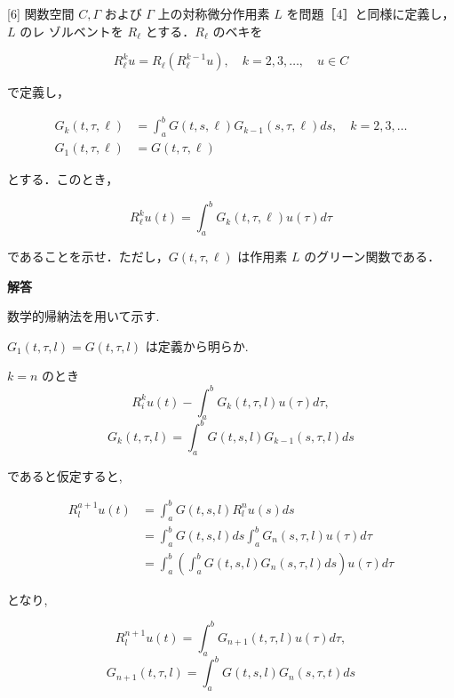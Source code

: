\documentclass{jsarticle}
\begin{document}
\begin{itembox}[l]{[6]}
関数空間 $C, \Gamma$ および $\Gamma$ 上の対称微分作用素 $L$ を問題［4］と同様に定義し，$L$ のレ ゾルベントを $R_{\ell}$ とする．$R_{\ell}$ のベキを


\begin{equation*}
R_{\ell}^{k} u=R_{\ell}\left(R_{\ell}^{k-1} u\right), \quad k=2,3, \ldots, \quad u \in C \tag{12}
\end{equation*}


で定義し，


\begin{align*}
G_{k}(t, \tau, \ell) & =\int_{a}^{b} G(t, s, \ell) G_{k-1}(s, \tau, \ell) d s, \quad k=2,3, \ldots  \tag{13}\\
G_{1}(t, \tau, \ell) & =G(t, \tau, \ell) \tag{14}
\end{align*}


とする．このとき，


\begin{equation*}
R_{\ell}^{k} u(t)=\int_{a}^{b} G_{k}(t, \tau, \ell) u(\tau) d \tau \tag{15}
\end{equation*}


であることを示せ．ただし，$G(t, \tau, \ell)$ は作用素 $L$ のグリーン関数である．  
\end{itembox}

\textbf{解答}

数学的帰納法を用いて示す.

$G_{1}(t, \tau, l) = G(t, \tau, l)$ は定義から明らか.

$k = n$ のとき
$$
R_{i}^{k} u(t)-\int_{a}^{b} G_{k}(t, \tau, l) u(\tau) d \tau,
$$
$$
G_k(t, \tau, l) = \int_a^b G(t,s,l)G_{k-1}(s,\tau,l) ds
$$

であると仮定すると, \ 

$$
\begin{aligned}
R_{l}^{a+1} u(t) & =\int_{a}^{b} G(t, s, l) R_{l}^{n} u(s) d s \\
& =\int_{a}^{b} G(t, s, l) d s \int_{a}^{b} G_{n}(s, \tau, l) u(\tau) d \tau \\
& =\int_{a}^{b}\left(\int_{a}^{b} G(t, s, l) G_{n}(s, \tau, l) d s\right) u(\tau) d \tau
\end{aligned}
$$

となり, 

$$
R_{l}^{n+1} u(t)=\int_{a}^{b} G_{n+1}(t, \tau, l) u(\tau) d \tau,
$$
$$
G_{n+1}(t, \tau, l) = \int_{a}^{b} G(t, s, l) G_{n}(s, \tau, t) d s
$$

\bigskip
\bigskip
\end{document}
